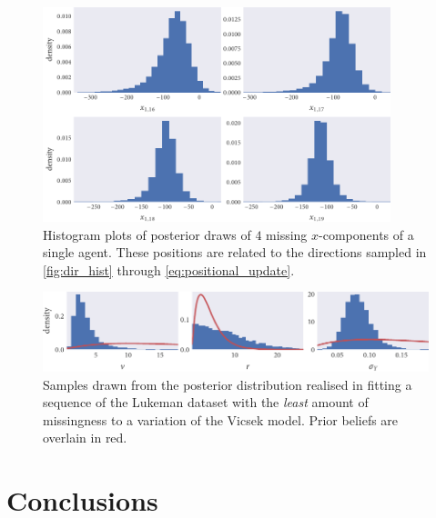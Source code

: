 \begin{figure}[tb]
  \includegraphics[width=0.9\textwidth]{x_hist.pdf}
  \caption{Histogram plots of posterior draws of $4$ missing $x$-components of
     a single agent. These positions are related to the directions sampled in
     \cref{fig:dir_hist} through \cref{eq:positional_update}.}
  \label{fig:x_hist}
\end{figure}

\begin{figure}[tb]
  \includegraphics{params_hist.pdf}
  \caption{Samples drawn from the posterior distribution realised in fitting a
    sequence of the Lukeman dataset with the \emph{least} amount of missingness
    to a variation of the Vicsek model. Prior beliefs are overlain in red.}
  \label{fig:lukeman_params}
\end{figure}

\section*{Conclusions}


